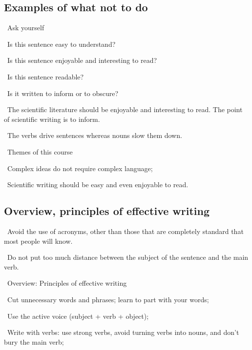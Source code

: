 \documentclass[a4paper, 12pt]{article}
\begin{document}
\subsection{Examples of what not to do}

\vspace{4pt}\par\textbullet\ Ask yourself
\par\quad\textopenbullet\ Is this sentence easy to understand?
\par\quad\textopenbullet\ Is this sentence enjoyable and interesting to read?
\par\quad\textopenbullet\ Is this sentence readable?
\par\quad\textopenbullet\ Is it written to inform or to obscure?

\vspace{4pt}\par\textbullet\ The scientific literature should be enjoyable and interesting to read. The point of scientific writing is to inform.

\vspace{4pt}\par\textbullet\ The verbs drive sentences whereas nouns slow them down.

\vspace{4pt}\par\textbullet\ Themes of this course
\par\quad\textopenbullet\ Complex ideas do not require complex language;
\par\quad\textopenbullet\ Scientific writing should be easy and even enjoyable to read.

\subsection{Overview, principles of effective writing}

\vspace{4pt}\par\textbullet\ Avoid the use of acronyms, other than those that are completely standard that most people will know.

\vspace{4pt}\par\textbullet\ Do not put too much distance between the subject of the sentence and the main verb.

\vspace{4pt}\par\textbullet\ Overview: Principles of effective writing
\par\quad\textopenbullet\ Cut unnecessary words and phrases; learn to part with your words;
\par\quad\textopenbullet\ Use the active voice (subject + verb + object);
\par\quad\textopenbullet\ Write with verbs: use strong verbs, avoid turning verbs into nouns, and don't bury the main verb;
\end{document}

